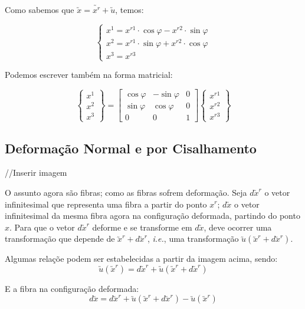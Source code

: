 \documentclass[12pt, a4paper]{article}
\begin{document}
\begin{enumerate}[a)]
			Como sabemos que $\utilde{x}=\utilde{x^r}+\utilde{u}$, temos:
			
			\[
				\begin{cases}
					x^1=x^{r1}\cdot\cos\varphi-x^{r2}\cdot\sin\varphi \\ x^2=x^{r1}\cdot\sin\varphi+x^{r2}\cdot\cos\varphi \\ x^3=x^{r3}
				\end{cases}
			\]
			
			Podemos escrever também na forma matricial:
			
			\[
				\begin{Bmatrix}
					x^1 \\ x^2 \\ x^3
				\end{Bmatrix}
				=
				\begin{bmatrix}
				
					\cos\varphi & -\sin\varphi & 0 \\
					\sin\varphi & \cos\varphi & 0 \\
					0 & 0 & 1
				\end{bmatrix}
				\begin{Bmatrix}
					x^{r1} \\ x^{r2} \\ x^{r3}
				\end{Bmatrix}							
			\]
	\end{enumerate}
		
	\subsection{Deformação Normal e por Cisalhamento}
	
	//Inserir imagem
	
	O assunto agora são fibras; como as fibras sofrem deformação. Seja $d\utilde{x}^r$ o vetor infinitesimal que representa uma fibra a partir do ponto $x^r$; $d\utilde{x}$ o vetor infinitesimal da mesma fibra agora na configuração deformada, partindo do ponto $x$.
	Para que o vetor $d\utilde{x}^r$ deforme e se transforme em $d\utilde{x}$, deve ocorrer uma transformação que depende de $\utilde{x}^r+d\utilde{x}^r$, \textit{i.e.}, uma transformação $\utilde{u}(\utilde{x}^r+d\utilde{x}^r)$.
	
	Algumas relaçõe podem ser estabelecidas a partir da imagem acima, sendo:
	\[\utilde{u}(\utilde{x}^r)=d\utilde{x}^r+\utilde{u}(\utilde{x}^r+d\utilde{x}^r)\]
	
	E a fibra na configuração deformada:	
	\[d\utilde{x}=d\utilde{x}^r+\utilde{u}(\utilde{x}^r+d\utilde{x}^r)-\utilde{u}(\utilde{x}^r)\]
	
\end{document}
